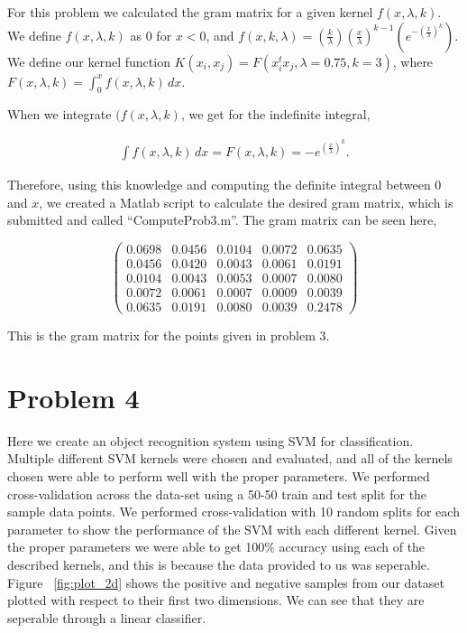 \documentclass[paper=a4, fontsize=11pt]{scrartcl} %
\begin{document}
For this problem we calculated the gram matrix for a given kernel $f(x,\lambda,k)$.
We define $f(x,\lambda,k)$ as $0$ for $x < 0$, and $f(x,k,\lambda)=(\frac{k}{\lambda})(\frac{x}{\lambda})^{k-1}(e^{-(\frac{x}{\lambda})^k})$.
We define our kernel function $K(x_i,x_j) = F(x_i^tx_j,\lambda=0.75,k=3)$, where $F(x,\lambda,k) =\int^x_0 f(x,\lambda,k)\,dx$. 

When we integrate $(f(x,\lambda,k)$, we get for the indefinite integral, 

\begin{align}
\int f(x,\lambda,k) \,dx = F(x,\lambda,k) = -e^{(\frac{x}{\lambda})^k}.
\end{align}

Therefore, using this knowledge and computing the definite integral between $0$ and $x$, we created a Matlab script to calculate the desired gram matrix, which is submitted and called ``ComputeProb3.m''.
The gram matrix can be seen here, 

\[ \left( \begin{array}{ccccc}
0.0698 & 0.0456 & 0.0104 & 0.0072 & 0.0635 \\
0.0456 & 0.0420 & 0.0043 & 0.0061 & 0.0191 \\
0.0104 & 0.0043 & 0.0053 & 0.0007 & 0.0080 \\
0.0072 & 0.0061 & 0.0007 & 0.0009 & 0.0039 \\
0.0635 & 0.0191 & 0.0080 & 0.0039 & 0.2478\end{array} \right)\] 

This is the gram matrix for the points given in problem 3.

\section{Problem 4}

Here we create an object recognition system using SVM for classification.
Multiple different SVM kernels were chosen and evaluated, and all of the kernels chosen were able to perform well with the proper parameters.  
We performed cross-validation across the data-set using a 50-50 train and test split for the sample data points.
We performed cross-validation with 10 random splits for each parameter to show the performance of the SVM with each different kernel.
Given the proper parameters we were able to get 100\% accuracy using each of the described kernels, and this is because the data provided to us was seperable.  
Figure ~\ref{fig:plot_2d} shows the positive and negative samples from our dataset plotted with respect to their first two dimensions.
We can see that they are seperable through a linear classifier.
\end{document}
